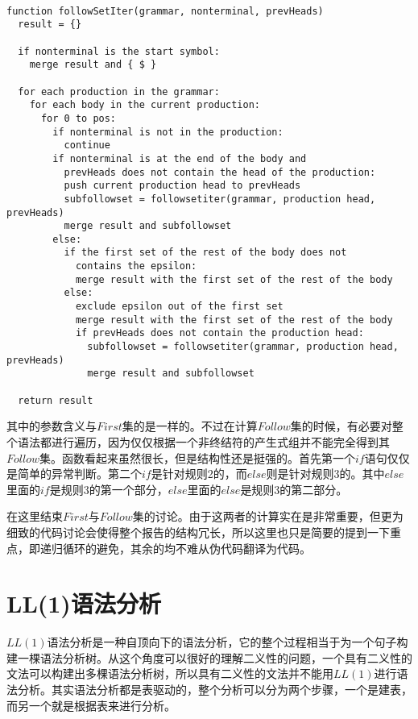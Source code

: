 \begin{verbatim}

function followSetIter(grammar, nonterminal, prevHeads)
  result = {}

  if nonterminal is the start symbol:
    merge result and { $ }

  for each production in the grammar:
    for each body in the current production:
      for 0 to pos:
        if nonterminal is not in the production:
          continue
        if nonterminal is at the end of the body and
          prevHeads does not contain the head of the production:
          push current production head to prevHeads
          subfollowset = followsetiter(grammar, production head, prevHeads)
          merge result and subfollowset
        else:
          if the first set of the rest of the body does not
            contains the epsilon:
            merge result with the first set of the rest of the body
          else:
            exclude epsilon out of the first set
            merge result with the first set of the rest of the body
            if prevHeads does not contain the production head:
              subfollowset = followsetiter(grammar, production head, prevHeads)
              merge result and subfollowset
              
  return result

\end{verbatim}

其中的参数含义与$First$集的是一样的。不过在计算$Follow$集的时候，有必要对整个语法都进行遍历，因为仅仅根据一个非终结符的产生式组并不能完全得到其$Follow$集。函数看起来虽然很长，但是结构性还是挺强的。首先第一个$if$语句仅仅是简单的异常判断。第二个$if$是针对规则2的，而$else$则是针对规则3的。其中$else$里面的$if$是规则3的第一个部分，$else$里面的$else$是规则3的第二部分。

在这里结束$First$与$Follow$集的讨论。由于这两者的计算实在是非常重要，但更为细致的代码讨论会使得整个报告的结构冗长，所以这里也只是简要的提到一下重点，即递归循环的避免，其余的均不难从伪代码翻译为代码。

\section{LL(1)语法分析}

$LL(1)$语法分析是一种自顶向下的语法分析，它的整个过程相当于为一个句子构建一棵语法分析树。从这个角度可以很好的理解二义性的问题，一个具有二义性的文法可以构建出多棵语法分析树，所以具有二义性的文法并不能用$LL(1)$进行语法分析。其实语法分析都是表驱动的，整个分析可以分为两个步骤，一个是建表，而另一个就是根据表来进行分析。


